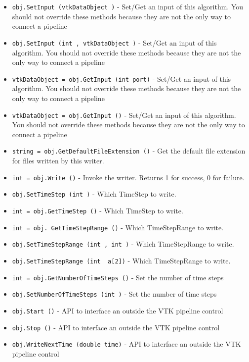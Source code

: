 \begin{itemize}
\item  \verb|obj.SetInput (vtkDataObject )| -  Set/Get an input of this algorithm. You should not override these
 methods because they are not the only way to connect a pipeline

\item  \verb|obj.SetInput (int , vtkDataObject )| -  Set/Get an input of this algorithm. You should not override these
 methods because they are not the only way to connect a pipeline

\item  \verb|vtkDataObject = obj.GetInput (int port)| -  Set/Get an input of this algorithm. You should not override these
 methods because they are not the only way to connect a pipeline

\item  \verb|vtkDataObject = obj.GetInput ()| -  Set/Get an input of this algorithm. You should not override these
 methods because they are not the only way to connect a pipeline

\item  \verb|string = obj.GetDefaultFileExtension ()| -  Get the default file extension for files written by this writer.

\item  \verb|int = obj.Write ()| -  Invoke the writer.  Returns 1 for success, 0 for failure.

\item  \verb|obj.SetTimeStep (int )| -  Which TimeStep to write.

\item  \verb|int = obj.GetTimeStep ()| -  Which TimeStep to write.

\item  \verb|int = obj. GetTimeStepRange ()| -  Which TimeStepRange to write.

\item  \verb|obj.SetTimeStepRange (int , int )| -  Which TimeStepRange to write.

\item  \verb|obj.SetTimeStepRange (int  a[2])| -  Which TimeStepRange to write.

\item  \verb|int = obj.GetNumberOfTimeSteps ()| -  Set the number of time steps

\item  \verb|obj.SetNumberOfTimeSteps (int )| -  Set the number of time steps

\item  \verb|obj.Start ()| -  API to interface an outside the VTK pipeline control

\item  \verb|obj.Stop ()| -  API to interface an outside the VTK pipeline control

\item  \verb|obj.WriteNextTime (double time)| -  API to interface an outside the VTK pipeline control

\end{itemize}
